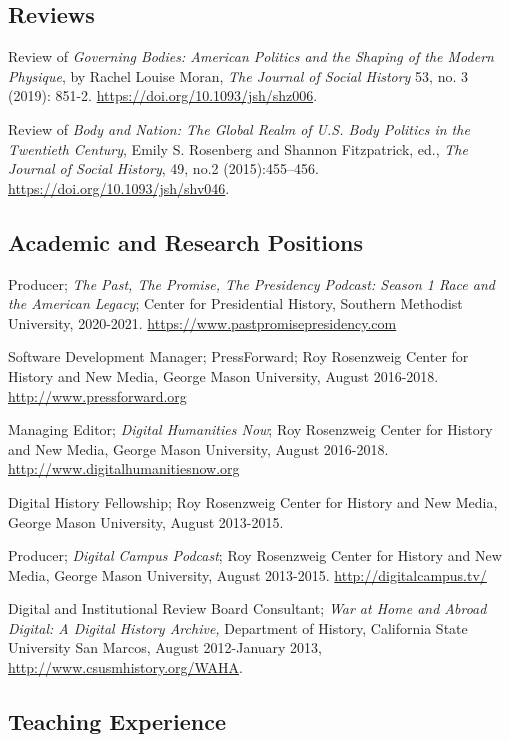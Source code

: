 \documentclass[11pt]{article}
\begin{document}
\subsection{Reviews}\label{reviews}

Review of \emph{Governing Bodies: American Politics and the Shaping of the Modern Physique}, by Rachel Louise Moran, \emph{The Journal of Social History} 53, no. 3 (2019): 851-2. \url{https://doi.org/10.1093/jsh/shz006}.

Review of \emph{Body and Nation: The Global Realm of U.S. Body Politics in the Twentieth Century}, Emily S. Rosenberg and Shannon Fitzpatrick, ed., \emph{The Journal of Social History}, 49, no.2 (2015):455–456. \url{https://doi.org/10.1093/jsh/shv046}.

\subsection{Academic and Research Positions}

Producer; \emph{The Past, The Promise, The Presidency Podcast: Season 1 Race and the American Legacy}; Center for Presidential History, Southern Methodist University, 2020-2021. \url{https://www.pastpromisepresidency.com}

Software Development Manager; PressForward; Roy Rosenzweig Center for History and New Media, George Mason University, August 2016-2018. \url{http://www.pressforward.org}

Managing Editor; \emph{Digital Humanities Now}; Roy Rosenzweig Center for History and New Media, George Mason University, August 2016-2018. \url{http://www.digitalhumanitiesnow.org}

Digital History Fellowship; Roy Rosenzweig Center for History and New Media, George Mason University, August 2013-2015.

Producer; \emph{Digital Campus Podcast}; Roy Rosenzweig Center for History and New Media, George Mason University, August 2013-2015. \url{http://digitalcampus.tv/}

Digital and Institutional Review Board Consultant; \emph{War at Home and Abroad Digital: A Digital History Archive,} Department of History, California State University San Marcos, August 2012-January 2013, \url{http://www.csusmhistory.org/WAHA}.

\subsection{Teaching Experience}
\end{document}
